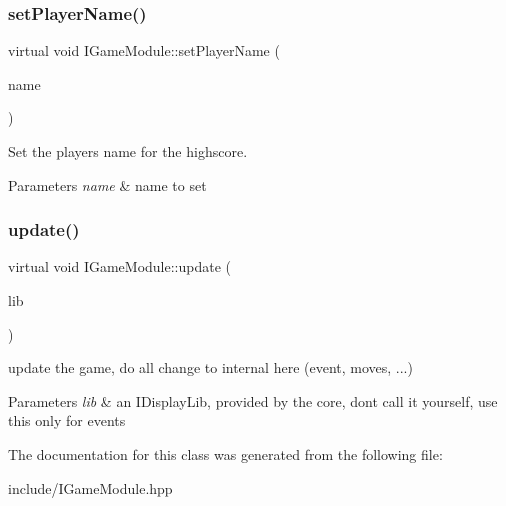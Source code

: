 \subsubsection{\texorpdfstring{set\+Player\+Name()}{setPlayerName()}}
{\footnotesize\ttfamily virtual void I\+Game\+Module\+::set\+Player\+Name (\begin{DoxyParamCaption}\item[{const std\+::string \&}]{name }\end{DoxyParamCaption})\hspace{0.3cm}{\ttfamily [pure virtual]}}



Set the player\textquotesingle{}s name for the highscore. 


\begin{DoxyParams}{Parameters}
{\em name} & name to set \\
\hline
\end{DoxyParams}
\mbox{\label{class_i_game_module_ab49e35fa262602b563131ddacce11b7c}} 
\subsubsection{\texorpdfstring{update()}{update()}}
{\footnotesize\ttfamily virtual void I\+Game\+Module\+::update (\begin{DoxyParamCaption}\item[{const \hyperlink{class_i_display_module}{I\+Display\+Module} \&}]{lib }\end{DoxyParamCaption})\hspace{0.3cm}{\ttfamily [pure virtual]}}



update the game, do all change to internal here (event, moves, ...) 


\begin{DoxyParams}{Parameters}
{\em lib} & an I\+Display\+Lib, provided by the core, dont call it yourself, use this only for events \\
\hline
\end{DoxyParams}


The documentation for this class was generated from the following file\+:\begin{DoxyCompactItemize}
\item 
include/I\+Game\+Module.\+hpp\end{DoxyCompactItemize}
